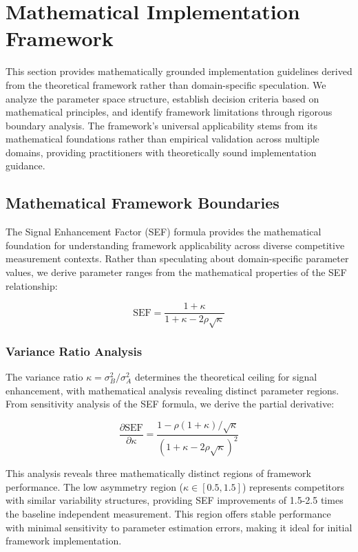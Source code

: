 \section{Mathematical Implementation Framework}

This section provides mathematically grounded implementation guidelines derived from the theoretical framework rather than domain-specific speculation. We analyze the parameter space structure, establish decision criteria based on mathematical principles, and identify framework limitations through rigorous boundary analysis. The framework's universal applicability stems from its mathematical foundations rather than empirical validation across multiple domains, providing practitioners with theoretically sound implementation guidance.

\subsection{Mathematical Framework Boundaries}

The Signal Enhancement Factor (SEF) formula provides the mathematical foundation for understanding framework applicability across diverse competitive measurement contexts. Rather than speculating about domain-specific parameter values, we derive parameter ranges from the mathematical properties of the SEF relationship:

\begin{equation}
\text{SEF} = \frac{1 + \kappa}{1 + \kappa - 2\rho\sqrt{\kappa}}
\end{equation}

\subsubsection{Variance Ratio Analysis}

The variance ratio $\kappa = \sigma_B^2/\sigma_A^2$ determines the theoretical ceiling for signal enhancement, with mathematical analysis revealing distinct parameter regions. From sensitivity analysis of the SEF formula, we derive the partial derivative:

\begin{equation}
\frac{\partial \text{SEF}}{\partial \kappa} = \frac{1 - \rho(1 + \kappa)/\sqrt{\kappa}}{(1 + \kappa - 2\rho\sqrt{\kappa})^2}
\end{equation}

This analysis reveals three mathematically distinct regions of framework performance. The low asymmetry region ($\kappa \in [0.5, 1.5]$) represents competitors with similar variability structures, providing SEF improvements of 1.5-2.5 times the baseline independent measurement. This region offers stable performance with minimal sensitivity to parameter estimation errors, making it ideal for initial framework implementation.

